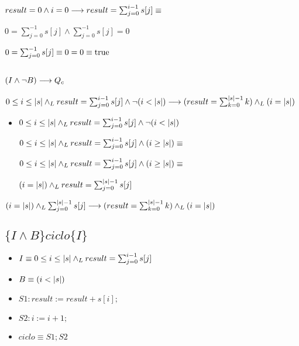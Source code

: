 \documentclass{article}
\begin{document}
$result = 0 \wedge i = 0 \longrightarrow 
        result = \sum_{j=0}^{i-1} s[j] \equiv$

$0 = \sum_{j=0}^{-1} s[j] \wedge
    \sum_{j=0}^{-1} s[j] = 0$

$0 = \sum_{j=0}^{-1} s[j] \equiv 0 = 0 \equiv \mathrm{true}$


\subsection*{$(I \wedge \neg B) \longrightarrow Q_{c}$}

$0 \leq i \leq |s| \land _L result = \sum_{j=0}^{i-1} s[j] \wedge 
    \neg (i < |s|)
    \longrightarrow
    (result = \sum_{k=0}^{|s|-1} k) \land _L
    (i = |s|)$

\begin{itemize}
    \item $0 \leq i \leq |s| \land _L result = \sum_{j=0}^{i-1} s[j] \wedge \neg (i < |s|)$

    $0 \leq i \leq |s| \land _L result = \sum_{j=0}^{i-1} s[j] \wedge 
        (i \geq |s|) \equiv$

    $0 \leq i \leq |s| \land _L result = \sum_{j=0}^{i-1} s[j] \wedge 
        (i \geq |s|) \equiv$

    $(i = |s|) \land _L result = \sum_{j=0}^{|s|-1} s[j]$

\end{itemize}

$(i = |s|) \land _L \sum_{j=0}^{|s|-1} s[j] \longrightarrow
    (result = \sum_{k=0}^{|s|-1} k) \land _L
    (i = |s|)$

\subsection*{$\{I \wedge B\}  ciclo  \{ I \}$}

\begin{itemize}
    \item $I \equiv 0 \leq i \leq |s| \land _L result = \sum_{j=0}^{i-1} s[j]$
    \item $B \equiv (i < |s|)$
    \item $S1: result := result + s[i];$
    \item $S2: i := i + 1;$
    \item $ciclo \equiv S1; S2$
\end{itemize}
\end{document}
